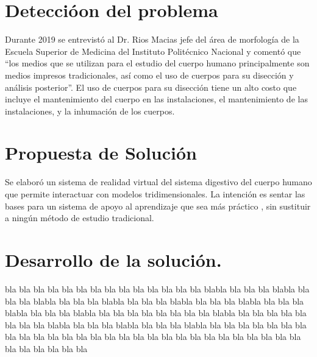 \documentclass[11pt,letter]{report}
\begin{document}
\newpage

\section{Detecci\'oon del problema} 

Durante 2019 se entrevistó al Dr. Rios Macias jefe del área de morfología de la Escuela Superior de Medicina del Instituto Politécnico Nacional y comentó que “los medios que se utilizan para el estudio del cuerpo humano principalmente son medios impresos tradicionales, así como el uso de cuerpos para su disección y análisis posterior”. El uso de cuerpos para su disección tiene un alto costo que incluye el mantenimiento del cuerpo en las instalaciones, el mantenimiento de las instalaciones, y la inhumación de los cuerpos.
\\
\newline
\section{Propuesta de Solución}

Se elaboró un sistema de realidad virtual del sistema digestivo del cuerpo humano que permite interactuar con modelos tridimensionales. La intención es sentar las bases para un sistema de apoyo al aprendizaje que sea más práctico \cite{APA:Ref1}, sin sustituir a ningún método de estudio tradicional.
\\
\newline
\section{Desarrollo de la solución.}

bla bla bla bla bla bla bla bla bla bla bla bla bla bla blabla bla bla bla blabla bla bla bla blabla bla bla bla blabla bla bla bla blabla bla bla bla blabla bla bla bla blabla bla bla bla blabla bla bla bla bla bla bla bla bla blabla bla bla bla bla bla bla bla bla blabla bla bla bla blabla bla bla bla blabla bla bla bla bla bla bla bla bla bla bla bla bla bla bla bla bla bla bla bla bla bla bla bla bla bla bla bla bla bla bla bla bla bla bla
\end{document}
